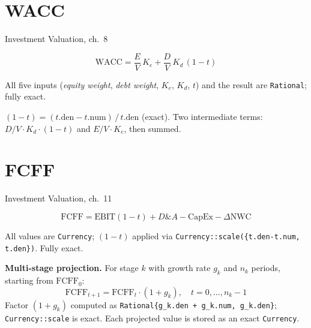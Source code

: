 \documentclass[11pt, a4paper, oneside]{article}
\newcommand{\EBIT}{\mathrm{EBIT}}
\newcommand{\FCFF}{\mathrm{FCFF}}
\newcommand{\WACC}{\mathrm{WACC}}
\newcommand{\Ke}{K_e}
\newcommand{\Kd}{K_d}
\newcommand{\NWC}{\mathrm{NWC}}
\newcommand{\DA}{D\&A}
\begin{document}
\section{WACC}
\label{sec:wacc}

\begin{damodaran}{Investment Valuation, ch.~8}
\end{damodaran}

\begin{equation}
  \WACC = \frac{E}{V}\,\Ke + \frac{D}{V}\,\Kd\,(1-t)
  \label{eq:wacc}
\end{equation}

All five inputs (\emph{equity weight}, \emph{debt weight}, $\Ke$, $\Kd$, $t$)
and the result are \texttt{Rational}; fully exact.

\begin{impl}{}
$(1-t) = (t.\mathrm{den} - t.\mathrm{num})\,/\,t.\mathrm{den}$ (exact).
Two intermediate terms: $D/V \cdot \Kd \cdot (1-t)$ and $E/V \cdot \Ke$,
then summed.
\end{impl}

\section{FCFF}
\label{sec:fcff}

\begin{damodaran}{Investment Valuation, ch.~11}
\end{damodaran}

\begin{equation}
  \FCFF = \EBIT(1-t) + \DA - \mathrm{CapEx} - \Delta\NWC
  \label{eq:fcff}
\end{equation}

All values are \texttt{Currency}; $(1-t)$ applied via
\texttt{Currency::scale(\{t.den-t.num, t.den\})}. Fully exact.

\textbf{Multi-stage projection.}
For stage $k$ with growth rate $g_k$ and $n_k$ periods, starting from
$\FCFF_0$:
\begin{equation}
  \FCFF_{t+1} = \FCFF_t \cdot (1+g_k), \quad t = 0,\ldots,n_k - 1
  \label{eq:fcff_proj}
\end{equation}
Factor $(1+g_k)$ computed as \texttt{Rational\{g\_k.den + g\_k.num, g\_k.den\}};
\texttt{Currency::scale} is exact. Each projected value is stored as an
exact \texttt{Currency}.
\end{document}
